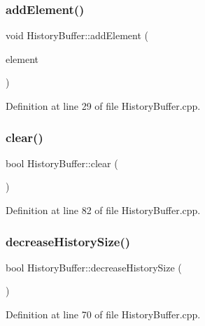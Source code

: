 \subsubsection{\texorpdfstring{add\+Element()}{addElement()}}
{\footnotesize\ttfamily void History\+Buffer\+::add\+Element (\begin{DoxyParamCaption}\item[{const Eigen\+::\+Ref$<$ const Eigen\+::\+Vector\+Xd $>$ \&}]{element }\end{DoxyParamCaption})}



Definition at line 29 of file History\+Buffer.\+cpp.

\mbox{\label{classbfl_1_1HistoryBuffer_ad9d3d44d796dccc5adb22be9594618c8}} 
\subsubsection{\texorpdfstring{clear()}{clear()}}
{\footnotesize\ttfamily bool History\+Buffer\+::clear (\begin{DoxyParamCaption}{ }\end{DoxyParamCaption})}



Definition at line 82 of file History\+Buffer.\+cpp.

\mbox{\label{classbfl_1_1HistoryBuffer_a3113fb73683eb5001e7fef0c6d3806cb}} 
\subsubsection{\texorpdfstring{decrease\+History\+Size()}{decreaseHistorySize()}}
{\footnotesize\ttfamily bool History\+Buffer\+::decrease\+History\+Size (\begin{DoxyParamCaption}{ }\end{DoxyParamCaption})}



Definition at line 70 of file History\+Buffer.\+cpp.

\mbox{\label{classbfl_1_1HistoryBuffer_a30d73c7a82d817122a4b5329e6b042e4}} 
